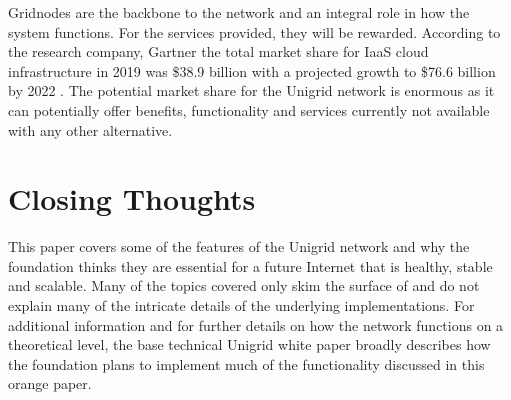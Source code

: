 \documentclass{article}
\begin{document}
\vspace{0.6cm}
\noindent Gridnodes are the backbone to the network and an integral role in how the system functions. For the services provided, they will be rewarded. According to the research company, Gartner the total market share for IaaS cloud infrastructure in 2019 was \$38.9 billion with a projected growth to \$76.6 billion by 2022 \cite{gartner2019}. The potential market share for the Unigrid network is enormous as it can potentially offer benefits, functionality and services currently not available with any other alternative.

\section{Closing Thoughts}
This paper covers some of the features of the Unigrid network and why the foundation thinks they are essential for a future Internet that is healthy, stable and scalable. Many of the topics covered only skim the surface of and do not explain many of the intricate details of the underlying implementations. For additional information and for further details on how the network functions on a theoretical level, the base technical Unigrid white paper \cite{wp2021} broadly describes how the foundation plans to implement much of the functionality discussed in this orange paper.
\end{document}
